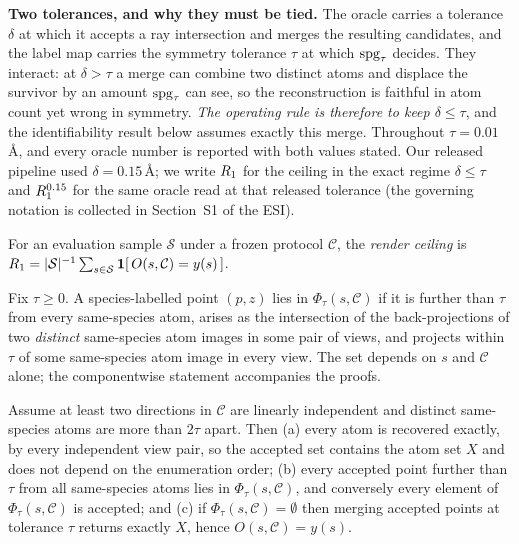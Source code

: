 \textbf{Two tolerances, and why they must be tied.} The oracle carries a tolerance $\delta$ at
which it accepts a ray intersection and merges the resulting candidates, and the label map carries the
symmetry tolerance $\tau$ at which $\mathrm{spg}_\tau$ decides. They interact: at $\delta > \tau$ a merge can combine two
distinct atoms and displace the survivor by an amount $\mathrm{spg}_\tau$ can see, so the reconstruction is faithful in
atom count yet wrong in symmetry. \emph{The operating rule is therefore to keep $\delta \le \tau$}, and the
identifiability result below assumes exactly this merge. Throughout $\tau = 0.01$\,\AA{}, and every oracle
number is reported with both values stated. Our released pipeline used $\delta = 0.15$\,\AA{}; we write
$R_1$ for the ceiling in the exact regime $\delta \le \tau$ and $R_1^{0.15}$ for the same oracle read at that
released tolerance (the governing notation is collected in Section~S1 of the ESI\dag{}).

\begin{definition} \label{def:ceiling} For an evaluation sample $\mathcal{S}$ under a frozen
protocol $\mathcal{C}$, the \emph{render ceiling} is $R_1 = |\mathcal{S}|^{-1}\sum_{s \in \mathcal{S}}
\mathbf{1}[\,O(s,\mathcal{C}) = y(s)\,]$. \end{definition}

\begin{definition}
\label{def:phantom}
Fix $\tau \ge 0$. A species-labelled point $(p,z)$ lies in $\Phi_\tau(s,\mathcal{C})$ if it is further than
$\tau$ from every same-species atom, arises as the intersection of the back-projections of two \emph{distinct}
same-species atom images in some pair of views, and projects within $\tau$ of some same-species atom image in
every view. The set depends on $s$ and $\mathcal{C}$ alone; the componentwise statement accompanies the
proofs.
\end{definition}

\begin{theorem}
\label{thm:ident}
Assume at least two directions in $\mathcal{C}$ are linearly independent and distinct same-species atoms are
more than $2\tau$ apart. Then (a) every atom is recovered exactly, by every independent view pair, so the
accepted set contains the atom set $X$ and does not depend on the enumeration order; (b) every accepted
point further than $\tau$ from all same-species atoms lies in $\Phi_\tau(s,\mathcal{C})$, and conversely
every element of $\Phi_\tau(s,\mathcal{C})$ is accepted; and (c) if $\Phi_\tau(s,\mathcal{C}) = \emptyset$
then merging accepted points at tolerance $\tau$ returns exactly $X$, hence $O(s,\mathcal{C}) = y(s)$.
\end{theorem}


